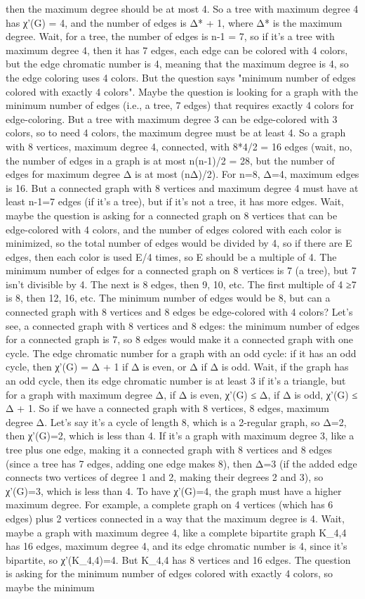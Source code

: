 then the maximum degree should be at most 4. So a tree with maximum degree 4 has χ'(G) = 4, and the number of edges is Δ* + 1, where Δ* is the maximum degree. Wait, for a tree, the number of edges is n-1 = 7, so if it's a tree with maximum degree 4, then it has 7 edges, each edge can be colored with 4 colors, but the edge chromatic number is 4, meaning that the maximum degree is 4, so the edge coloring uses 4 colors. But the question says "minimum number of edges colored with exactly 4 colors". Maybe the question is looking for a graph with the minimum number of edges (i.e., a tree, 7 edges) that requires exactly 4 colors for edge-coloring. But a tree with maximum degree 3 can be edge-colored with 3 colors, so to need 4 colors, the maximum degree must be at least 4. So a graph with 8 vertices, maximum degree 4, connected, with 8*4/2 = 16 edges (wait, no, the number of edges in a graph is at most n(n-1)/2 = 28, but the number of edges for maximum degree Δ is at most (nΔ)/2). For n=8, Δ=4, maximum edges is 16. But a connected graph with 8 vertices and maximum degree 4 must have at least n-1=7 edges (if it's a tree), but if it's not a tree, it has more edges. Wait, maybe the question is asking for a connected graph on 8 vertices that can be edge-colored with 4 colors, and the number of edges colored with each color is minimized, so the total number of edges would be divided by 4, so if there are E edges, then each color is used E/4 times, so E should be a multiple of 4. The minimum number of edges for a connected graph on 8 vertices is 7 (a tree), but 7 isn't divisible by 4. The next is 8 edges, then 9, 10, etc. The first multiple of 4 ≥7 is 8, then 12, 16, etc. The minimum number of edges would be 8, but can a connected graph with 8 vertices and 8 edges be edge-colored with 4 colors? Let's see, a connected graph with 8 vertices and 8 edges: the minimum number of edges for a connected graph is 7, so 8 edges would make it a connected graph with one cycle. The edge chromatic number for a graph with an odd cycle: if it has an odd cycle, then χ'(G) = Δ + 1 if Δ is even, or Δ if Δ is odd. Wait, if the graph has an odd cycle, then its edge chromatic number is at least 3 if it's a triangle, but for a graph with maximum degree Δ, if Δ is even, χ'(G) ≤ Δ, if Δ is odd, χ'(G) ≤ Δ + 1. So if we have a connected graph with 8 vertices, 8 edges, maximum degree Δ. Let's say it's a cycle of length 8, which is a 2-regular graph, so Δ=2, then χ'(G)=2, which is less than 4. If it's a graph with maximum degree 3, like a tree plus one edge, making it a connected graph with 8 vertices and 8 edges (since a tree has 7 edges, adding one edge makes 8), then Δ=3 (if the added edge connects two vertices of degree 1 and 2, making their degrees 2 and 3), so χ'(G)=3, which is less than 4. To have χ'(G)=4, the graph must have a higher maximum degree. For example, a complete graph on 4 vertices (which has 6 edges) plus 2 vertices connected in a way that the maximum degree is 4. Wait, maybe a graph with maximum degree 4, like a complete bipartite graph K_{4,4} has 16 edges, maximum degree 4, and its edge chromatic number is 4, since it's bipartite, so χ'(K_{4,4})=4. But K_{4,4} has 8 vertices and 16 edges. The question is asking for the minimum number of edges colored with exactly 4 colors, so maybe the minimum 